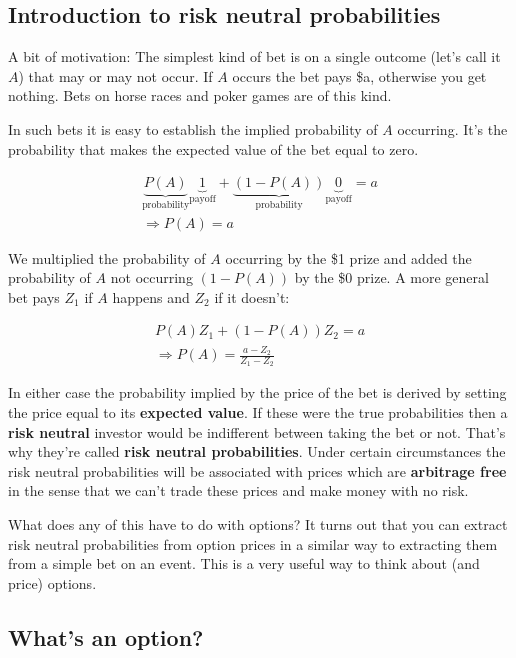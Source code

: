 \subsection{Introduction to risk neutral probabilities}
A bit of motivation: The simplest kind of bet is on a single outcome (let's call it $A$) that may or may not occur. If $A$ occurs the bet pays  \$a, otherwise you get nothing. Bets on horse races and poker games are of this kind.

In such bets it is easy to establish the implied probability of $A$ occurring. It's the probability that makes the expected value of the bet equal to zero. 

\begin{eqnarray*}
\underbrace{P(A)}_{\mbox{probability}}\underbrace{1}_{\mbox{payoff}} + \underbrace{(1-P(A))}_{\mbox{probability}}\underbrace{0}_{\mbox{payoff}} = a \\
\Rightarrow P(A) = a
\end{eqnarray*}

We multiplied the probability of $A$ occurring by the \$1 prize and added the probability of $A$ not occurring $(1-P(A))$ by the \$0 prize. A more general bet pays $Z_1$ if $A$ happens and $Z_2$ if it doesn't:

\begin{eqnarray*}
P(A)Z_1 + (1-P(A))Z_2 = a \\
\Rightarrow P(A) = \frac{a-Z_2}{Z_1-Z_2}
\end{eqnarray*}

In either case the probability implied by the price of the bet is derived by setting the price equal to its \textbf{expected value}. If these were the true probabilities then a \textbf{risk neutral} investor would be indifferent between taking the bet or not. That's why they're called \textbf{risk neutral probabilities}. Under certain circumstances the risk neutral probabilities will be associated with prices which are \textbf{arbitrage free} in the sense that we can't trade these prices and make money with no risk. 

What does any of this have to do with options? It turns out that you can extract risk neutral probabilities from option prices in a similar way to extracting them from a simple bet on an event. This is a very useful way to think about  (and price) options.

\subsection{What's an option?}

